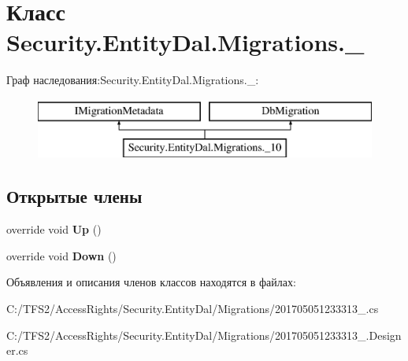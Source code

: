 \hypertarget{class_security_1_1_entity_dal_1_1_migrations_1_1__10}{}\section{Класс Security.\+Entity\+Dal.\+Migrations.\+\_}
\label{class_security_1_1_entity_dal_1_1_migrations_1_1__10}
Граф наследования\+:Security.\+Entity\+Dal.\+Migrations.\+\_\+:\begin{figure}[H]
\begin{center}
\leavevmode
\includegraphics[height=2.000000cm]{dd/d04/class_security_1_1_entity_dal_1_1_migrations_1_1__10}
\end{center}
\end{figure}
\subsection*{Открытые члены}
\begin{DoxyCompactItemize}
\item 
\mbox{\label{class_security_1_1_entity_dal_1_1_migrations_1_1__10_a2137b84650981d221876d7f59783884e}} 
override void {\bfseries Up} ()
\item 
\mbox{\label{class_security_1_1_entity_dal_1_1_migrations_1_1__10_ad5eb6fc9d2520c8346ff2db6cbc59bfd}} 
override void {\bfseries Down} ()
\end{DoxyCompactItemize}


Объявления и описания членов классов находятся в файлах\+:\begin{DoxyCompactItemize}
\item 
C\+:/\+T\+F\+S2/\+Access\+Rights/\+Security.\+Entity\+Dal/\+Migrations/201705051233313\+\_.\+cs\item 
C\+:/\+T\+F\+S2/\+Access\+Rights/\+Security.\+Entity\+Dal/\+Migrations/201705051233313\+\_.\+Designer.\+cs\end{DoxyCompactItemize}
